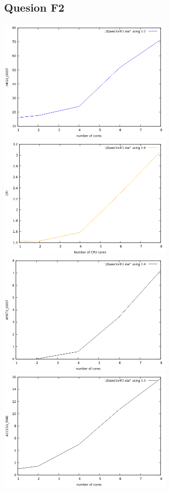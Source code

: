\documentclass[10pt]{article}
\begin{document}
\subsection{Quesion F2}
\begin{center}
  
  \includegraphics[width=8.5cm]{QuestionF2_1.png}
  \quad
  \includegraphics[width=8.5cm]{QuestionF2_5.png}
  \newline
  \includegraphics[width=8.5cm]{QuestionF2_3.png}
  \quad
  \includegraphics[width=8.5cm]{QuestionF2_4.png}
\end{center}
\end{document}
